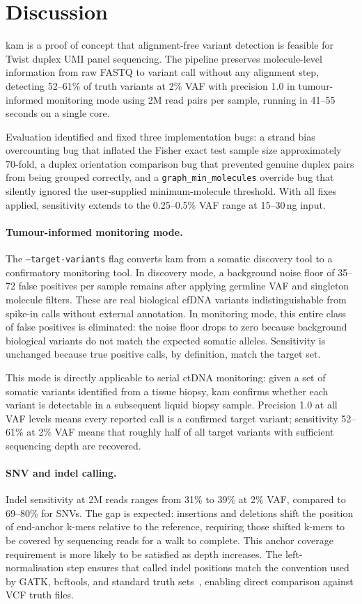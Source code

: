 \section{Discussion}
\label{sec:discussion}

kam is a proof of concept that alignment-free variant detection is feasible for
Twist duplex UMI panel sequencing.
The pipeline preserves molecule-level information from raw FASTQ to variant call
without any alignment step, detecting 52--61\% of truth variants at 2\% VAF
with precision 1.0 in tumour-informed monitoring mode using 2M read pairs per
sample, running in 41--55 seconds on a single core.

Evaluation identified and fixed three implementation bugs: a strand
bias overcounting bug that inflated the Fisher exact test sample size
approximately 70-fold, a duplex orientation comparison bug that prevented
genuine duplex pairs from being grouped correctly, and a
\texttt{graph\_min\_molecules} override bug that silently ignored the
user-supplied minimum-molecule threshold.
With all fixes applied, sensitivity extends to the 0.25--0.5\% VAF range at
15--30\,ng input.

\paragraph{Tumour-informed monitoring mode.}
The \texttt{--target-variants} flag converts kam from a somatic discovery tool
to a confirmatory monitoring tool.
In discovery mode, a background noise floor of 35--72 false positives per sample
remains after applying germline VAF and singleton molecule filters.
These are real biological cfDNA variants indistinguishable from spike-in calls
without external annotation.
In monitoring mode, this entire class of false positives is eliminated: the
noise floor drops to zero because background biological variants do not match
the expected somatic alleles.
Sensitivity is unchanged because true positive calls, by definition, match the
target set.

This mode is directly applicable to serial ctDNA monitoring: given a set of
somatic variants identified from a tissue biopsy, kam confirms whether each
variant is detectable in a subsequent liquid biopsy sample.
Precision 1.0 at all VAF levels means every reported call is a confirmed target
variant; sensitivity 52--61\% at 2\% VAF means that roughly half of all target
variants with sufficient sequencing depth are recovered.

\paragraph{SNV and indel calling.}
Indel sensitivity at 2M reads ranges from 31\% to 39\% at 2\% VAF, compared to
69--80\% for SNVs. The gap is expected: insertions and deletions shift the
position of end-anchor k-mers relative to the reference, requiring those
shifted k-mers to be covered by sequencing reads for a walk to complete. This
anchor coverage requirement is more likely to be satisfied as depth increases.
The left-normalisation step ensures that called indel positions match the
convention used by GATK, bcftools, and standard truth sets~\autocite{tan2015},
enabling direct comparison against VCF truth files.

